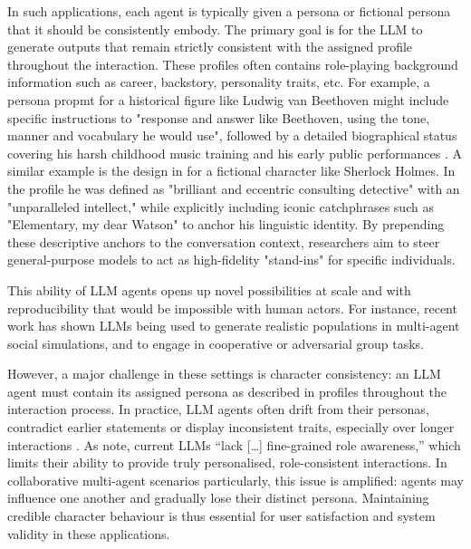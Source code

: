\documentclass{article}
\begin{document}
In such applications, each agent is typically given a persona or fictional persona that it should be consistently embody. The primary goal is for the LLM to generate outputs that remain strictly consistent with the assigned profile throughout the interaction. These profiles often contains role-playing background information such as career, backstory, personality traits, etc. For example, a persona propmt for a historical figure like Ludwig van Beethoven might include specific instructions to "response and answer like Beethoven, using the tone, manner and vocabulary he would use", followed by a detailed biographical status covering his harsh childhood music training and his early public performances \citep{shao2023characterllm}. A similar example is the design in \citet{wang2024rolellm} for a fictional character like Sherlock Holmes. In the profile he was defined as "brilliant and eccentric consulting detective" with an "unparalleled intellect," while explicitly including iconic catchphrases such as "Elementary, my dear Watson" to anchor his linguistic identity. By prepending these descriptive anchors to the conversation context, researchers aim to steer general-purpose models to act as high-fidelity "stand-ins" for specific individuals.

This ability of LLM agents opens up novel possibilities at scale and with reproducibility that would be impossible with human actors. For instance, recent work has shown LLMs being used to generate realistic populations in multi-agent social simulations, and to engage in cooperative \citep{guo2026collab} or adversarial \citep{baltaji2024cultured} group tasks. 

However, a major challenge in these settings is character consistency: an LLM agent must contain its assigned persona as described in profiles throughout the interaction process. In practice, LLM agents often drift from their personas, contradict earlier statements or display inconsistent traits, especially over longer interactions \citep{choi2024examining, bhandari2025ocean, abdulhai2025consistently}. As \citet{ji2025enhancing} note, current LLMs “lack […] fine-grained role awareness,” which limits their ability to provide truly personalised, role-consistent interactions. In collaborative multi-agent scenarios particularly, this issue is amplified: agents may influence one another and gradually lose their distinct persona. Maintaining credible character behaviour is thus essential for user satisfaction and system validity in these applications.
\end{document}
